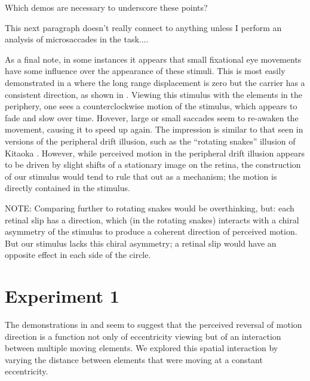 \documentclass[english,jou]{article}
\newenvironment{lyxgreyedout}
  {\textcolor{note_fontcolor}\bgroup\ignorespaces}
  {\ignorespacesafterend\egroup}
\begin{document}
\begin{lyxgreyedout}
Which demos are necessary to underscore these points?%
\end{lyxgreyedout}


\begin{lyxgreyedout}
This next paragraph doesn't really connect to anything unless I perform
an analysis of microsaccades in the task.... %
\end{lyxgreyedout}


As a final note, in some instances it appears that small fixational
eye movements have some influence over the appearance of these stimuli.
This is most easily demonstrated in a where the long range displacement
is zero but the carrier has a consistent direction, as shown in .
Viewing this stimulus with the elements in the periphery, one sees
a counterclockwise motion of the stimulus, which appears to fade and
slow over time. Hovever, large or small saccades seem to re-awaken
the movement, causing it to speed up again. The impression is similar
to that seen in versions of the peripheral drift illusion, such as
the ``rotating snakes'' illusion of Kitaoka \citep{Kitaoka:2007fv}.
However, while perceived motion in the peripheral drift illusion appears
to be driven by slight shifts of a stationary image on the retina,
the construction of our stimulus would tend to rule that out as a
mechanism; the motion is directly contained in the stimulus.

NOTE: Comparing further to rotating snakes would be overthinking,
but: each retinal slip has a direction, which (in the rotating snakes)
interacts with a chiral asymmetry of the stimulus to produce a coherent
direction of perceived motion. But our stimulus lacks this chiral
asymmetry; a retinal slip would have an opposite effect in each side
of the circle.

\pagebreak{}


\section{Experiment 1\label{sec:reversal}}

The demonstrations in and 
seem to suggest that the perceived reversal of motion direction is
a function not only of eccentricity viewing but of an interaction
between multiple moving elements. We explored this spatial interaction
by varying the distance between elements that were moving at a constant
eccentricity. 
\end{document}
